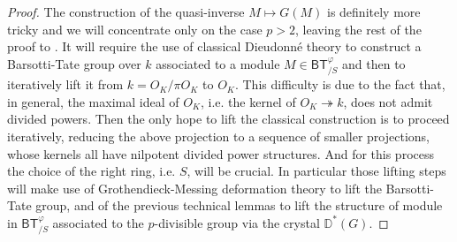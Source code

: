 \begin{proof}
The construction of the quasi-inverse $M \mapsto G(M)$
is definitely more tricky and we will concentrate only on
the case $p > 2$, leaving the rest of the proof to \cite{Kisin}.
It will require the use of classical Dieudonné theory to construct a
Barsotti-Tate group over $k$ associated to a module $M \in \mathsf{BT}^{\varphi}_{/S}$
and then to iteratively lift it from $k = O_K/\pi O_K$ to $O_K$.
This difficulty is due to the fact that, in general, the maximal
ideal of $O_K$, i.e. the kernel of $O_K \twoheadrightarrow k$, 
does not admit divided powers.
Then the only hope to lift the classical construction is to
proceed iteratively, reducing the above projection to a sequence of
smaller projections, whose kernels all have nilpotent divided power structures.
And for this process the choice of the right ring, i.e$.$ $S$, will be crucial.
In particular those lifting steps will make use of Grothendieck-Messing
deformation theory to lift the Barsotti-Tate group, and of the previous
technical lemmas to lift the structure of module in $\mathsf{BT}^{\varphi}_{/S}$
associated to the $p$-divisible group via the crystal $\mathbb{D}^*(G)$.



\end{proof}
